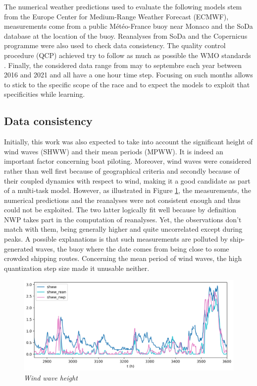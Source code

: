 \documentclass{article}
\newcommand{\saut}{\vspace{10px}}
\begin{document}
\saut

The numerical weather predictions used to evaluate the following models 
stem from the Europe Center for Medium-Range Weather Forecast (ECMWF), measurements come from a public
Météo-France buoy near Monaco and the SoDa database at the location of the buoy. Reanalyses from SoDa and
the Copernicus programme were also used to check data consistency. The quality control procedure (QCP) achieved
try to follow as much as possible the WMO standards \cite{organization_wmo_guidelines_2021}. Finally,
the considered data range from may to septembre each year between 2016 and 2021 and all have a one hour
time step. Focusing on such months allows to stick to the specific scope of the race and to expect the models
to exploit that specificities while learning.

\subsection*{Data consistency}

Initially, this work was also expected to take into account the significant height of wind waves (SHWW)
and their mean periods (MPWW).
It is indeed an important factor concerning boat piloting. Moreover, wind waves were considered rather than well
first because of geographical criteria and secondly because of their coupled dynamics with respect to wind, making it
a good candidate as part of a multi-task model. However, as illustrated in Figure \ref{shww}, the measurements, the
numerical predictions and the reanalyses were not consistent enough and thus could not be exploited. The two
latter logically fit well because by definition NWP takes part in the computation of reanalyses. Yet, the observations
don't match with them, being generally higher and quite uncorrelated except during peaks.
A possible explanations is that such measurements
are polluted by ship-generated waves, the buoy where the date comes from being close to some crowded shipping
routes. Concerning the mean period of wind waves, the high quantization step size made it unusable neither.

\saut

\begin{figure}[H]
    \centering
    \includegraphics[width=.95\linewidth]{img/shww.png}
    \caption{\textit{Wind wave height}}
   \label{shww}
\end{figure}
\end{document}
